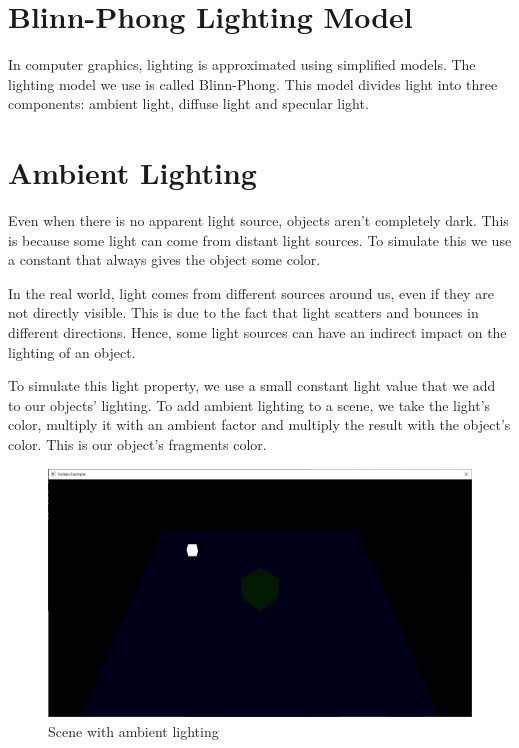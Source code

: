 \section{Blinn-Phong Lighting Model}

In computer graphics, lighting is approximated using simplified models.
The lighting model we use is called Blinn-Phong.
This model divides light into three components: ambient light, diffuse light and
specular light.

\section{Ambient Lighting}

Even when there is no apparent light source, objects aren't completely dark.
This is because some light can come from distant light sources.
To simulate this we use a constant that always gives the object some color.

In the real world, light comes from different sources around us, even if they
are not directly visible.
This is due to the fact that light scatters and bounces in different directions.
Hence, some light sources can have an indirect impact on the lighting of an object.

To simulate this light property, we use a small constant light value that we
add to our objects' lighting.
To add ambient lighting to a scene, we take the light's color, multiply it with
an ambient factor and multiply the result with the object's color.
This is our object's fragments color.

\begin{minipage}{\linewidth}{\noindent}
    
\end{minipage}

\begin{figure}[ht]
    \centering
    \includegraphics[scale=0.25]{images/ChBlinnPhong/SceneAmbient.png}
    \caption{Scene with ambient lighting}
    \label{fig::SceneAmbient}
\end{figure}

